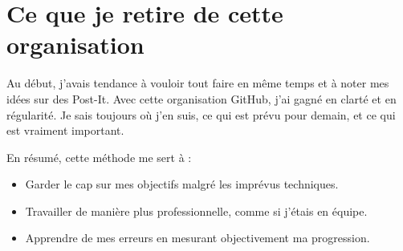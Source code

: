 \section{Ce que je retire de cette organisation}

Au début, j'avais tendance à vouloir tout faire en même temps et à noter mes idées sur des Post-It. Avec cette organisation GitHub, j'ai gagné en clarté et en régularité. Je sais toujours où j'en suis, ce qui est prévu pour demain, et ce qui est vraiment important.

En résumé, cette méthode me sert à :
\begin{itemize}
    \item Garder le cap sur mes objectifs malgré les imprévus techniques.
    \item Travailler de manière plus professionnelle, comme si j'étais en équipe.
    \item Apprendre de mes erreurs en mesurant objectivement ma progression.
\end{itemize}